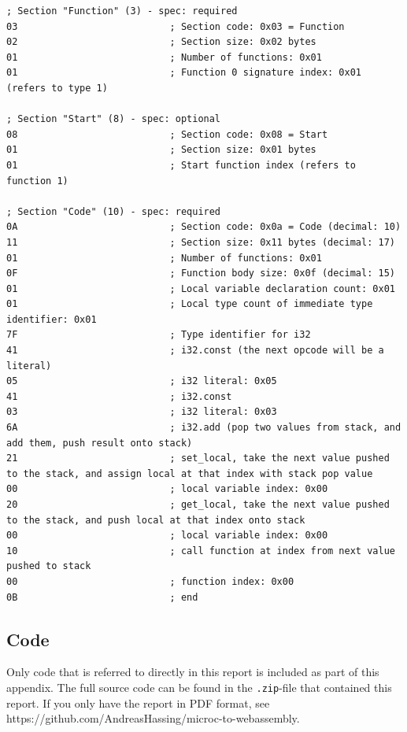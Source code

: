 \documentclass[a4paper]{article}
\begin{document}
\begin{verbatim}
; Section "Function" (3) - spec: required
03                           ; Section code: 0x03 = Function
02                           ; Section size: 0x02 bytes
01                           ; Number of functions: 0x01
01                           ; Function 0 signature index: 0x01 (refers to type 1)

; Section "Start" (8) - spec: optional
08                           ; Section code: 0x08 = Start
01                           ; Section size: 0x01 bytes
01                           ; Start function index (refers to function 1)

; Section "Code" (10) - spec: required
0A                           ; Section code: 0x0a = Code (decimal: 10)
11                           ; Section size: 0x11 bytes (decimal: 17)
01                           ; Number of functions: 0x01
0F                           ; Function body size: 0x0f (decimal: 15)
01                           ; Local variable declaration count: 0x01
01                           ; Local type count of immediate type identifier: 0x01
7F                           ; Type identifier for i32
41                           ; i32.const (the next opcode will be a literal)
05                           ; i32 literal: 0x05
41                           ; i32.const
03                           ; i32 literal: 0x03
6A                           ; i32.add (pop two values from stack, and add them, push result onto stack)
21                           ; set_local, take the next value pushed to the stack, and assign local at that index with stack pop value
00                           ; local variable index: 0x00
20                           ; get_local, take the next value pushed to the stack, and push local at that index onto stack
00                           ; local variable index: 0x00
10                           ; call function at index from next value pushed to stack
00                           ; function index: 0x00
0B                           ; end
\end{verbatim}

\newpage
\subsection{Code}
\label{sec:appendix:code}
Only code that is referred to directly in this report is included as part of this appendix. The full source code can be found in the \texttt{.zip}-file that contained this report. If you only have the report in PDF format, see https://github.com/AndreasHassing/microc-to-webassembly.
\end{document}
